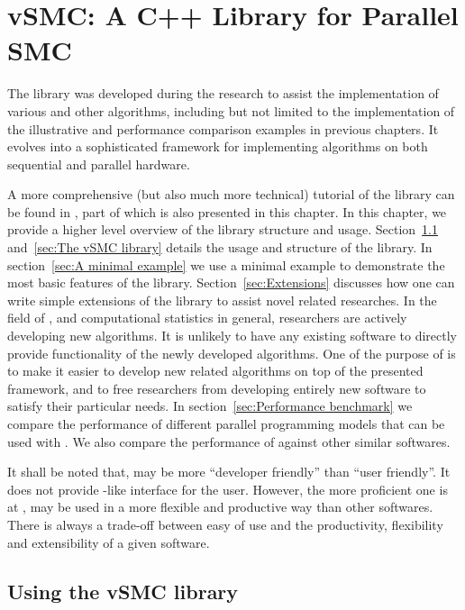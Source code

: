 \chapter{vSMC: A C++ Library for Parallel SMC}
\label{cha:vSMC: A C++ Library for Parallel SMC}

The \vsmc library \cite{software:VSMC} was developed during the research to
assist the implementation of various \smc and other algorithms, including but
not limited to the implementation of the illustrative and performance
comparison examples in previous chapters. It evolves into a sophisticated \cpp
framework for implementing \smc algorithms on both sequential and parallel
hardware.

A more comprehensive (but also much more technical) tutorial of the library
can be found in \cite{software:VSMC}, part of which is also presented in this
chapter. In this chapter, we provide a higher level overview of the library
structure and usage. Section~\ref{sec:Using the vSMC library} and~\ref{sec:The
  vSMC library} details the usage and structure of the library. In
section~\ref{sec:A minimal example} we use a minimal example to demonstrate
the most basic features of the library. Section~\ref{sec:Extensions} discusses
how one can write simple extensions of the library to assist novel \smc
related researches. In the field of \smc, and computational statistics in
general, researchers are actively developing new algorithms. It is unlikely to
have any existing software to directly provide functionality of the newly
developed algorithms. One of the purpose of \vsmc is to make it easier to
develop new \smc related algorithms on top of the presented framework, and to
free researchers from developing entirely new software to satisfy their
particular needs. In section~\ref{sec:Performance benchmark} we compare the
performance of different parallel programming models that can be used with
\vsmc. We also compare the performance of \vsmc against other similar
softwares.

It shall be noted that, \vsmc may be more ``developer friendly'' than ``user
friendly''. It does not provide \bugs-like interface for the user. However,
the more proficient one is at \cpp, \vsmc may be used in a more flexible and
productive way than other softwares. There is always a trade-off between
easy of use and the productivity, flexibility and extensibility of a given
software.

\section{Using the vSMC library}
\label{sec:Using the vSMC library}


